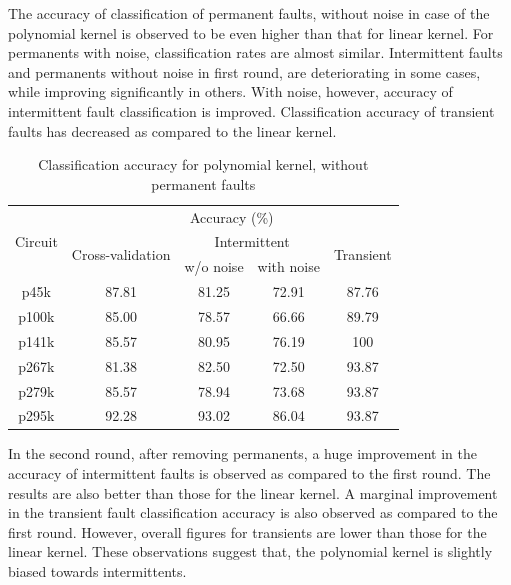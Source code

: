 The accuracy of classification of permanent faults, without noise in case of the polynomial kernel is observed to be even higher than that for linear kernel. For permanents with noise, classification rates are almost similar. Intermittent faults and permanents without noise in first round, are deteriorating in some cases, while improving significantly in others. With noise, however, accuracy of intermittent fault classification is improved. Classification accuracy of transient faults has decreased as compared to the linear kernel.

\begin{table}[h]
\captionsetup{justification=centering}
\begin{tabular}{ccccc}
\hline
\multirow{3}{*}{Circuit} & \multicolumn{4}{c}{Accuracy (\%)}\\ \cline{2-5} 
                         & \multirow{2}{*}{Cross-validation} & \multicolumn{2}{c}{Intermittent} & \multirow{2}{*}{Transient} \\ \cline{3-4}
                         &                                   & w/o noise      & with noise      &                            \\ \hline
p45k                     & 87.81                             & 81.25          & 72.91           & 87.76                      \\
p100k                    & 85.00                             & 78.57          & 66.66           & 89.79                      \\
p141k                    & 85.57                             & 80.95          & 76.19           & 100                        \\
p267k                    & 81.38                             & 82.50          & 72.50           & 93.87                      \\
p279k                    & 85.57                             & 78.94          & 73.68           & 93.87                      \\
p295k                    & 92.28                             & 93.02          & 86.04           & 93.87                      \\
\hline
\end{tabular}
\caption {Classification accuracy for polynomial kernel, without permanent faults}
\label{tab:polywop}
\end{table}

In the second round, after removing permanents, a huge improvement in the accuracy of intermittent faults is observed as compared to the first round. The results are also better than those for the linear kernel.  A marginal improvement in the transient fault classification accuracy is also observed as compared to the first round. However, overall figures for transients are lower than those for the linear kernel. These observations suggest that, the polynomial kernel is slightly biased towards intermittents.


